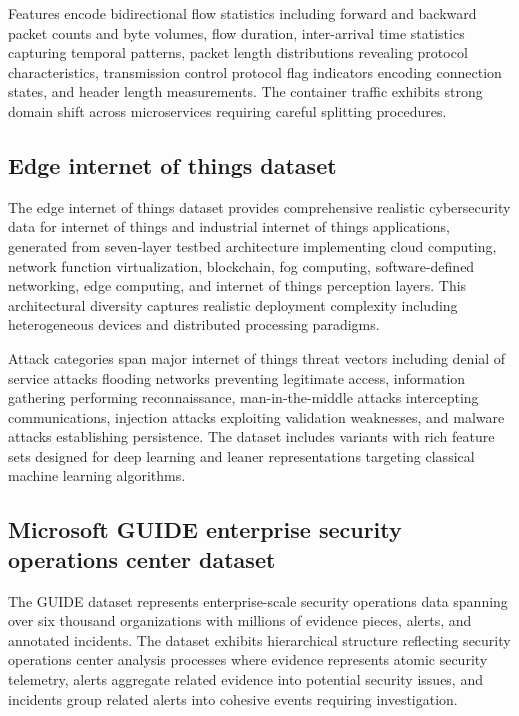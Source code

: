 \documentclass[10pt,journal,compsoc]{IEEEtran}
\begin{document}
Features encode bidirectional flow statistics including forward and backward packet counts and byte volumes, flow duration, inter-arrival time statistics capturing temporal patterns, packet length distributions revealing protocol characteristics, transmission control protocol flag indicators encoding connection states, and header length measurements. The container traffic exhibits strong domain shift across microservices requiring careful splitting procedures.

\subsection{Edge internet of things dataset}

The edge internet of things dataset provides comprehensive realistic cybersecurity data for internet of things and industrial internet of things applications, generated from seven-layer testbed architecture implementing cloud computing, network function virtualization, blockchain, fog computing, software-defined networking, edge computing, and internet of things perception layers. This architectural diversity captures realistic deployment complexity including heterogeneous devices and distributed processing paradigms.

Attack categories span major internet of things threat vectors including denial of service attacks flooding networks preventing legitimate access, information gathering performing reconnaissance, man-in-the-middle attacks intercepting communications, injection attacks exploiting validation weaknesses, and malware attacks establishing persistence. The dataset includes variants with rich feature sets designed for deep learning and leaner representations targeting classical machine learning algorithms.

\subsection{Microsoft GUIDE enterprise security operations center dataset}

The GUIDE dataset represents enterprise-scale security operations data spanning over six thousand organizations with millions of evidence pieces, alerts, and annotated incidents. The dataset exhibits hierarchical structure reflecting security operations center analysis processes where evidence represents atomic security telemetry, alerts aggregate related evidence into potential security issues, and incidents group related alerts into cohesive events requiring investigation.
\end{document}
